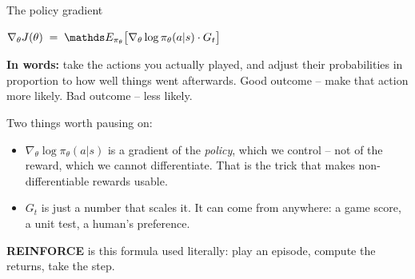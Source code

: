 \documentclass[aspectratio=169]{beamer}
\begin{document}
\begin{frame}{The policy gradient}
  \begin{center}
    {\large $\nabla_\theta J(\theta) \;=\; \E_{\pi_\theta}\big[\nabla_\theta \log \pi_\theta(a|s) \cdot G_t\big]$}
  \end{center}

  \vskip 10pt
  \begin{tcolorbox}[colback=paramgreen!8, colframe=paramgreen, boxrule=0.6pt, arc=2pt]
    \textbf{In words:} take the actions you actually played, and adjust their probabilities in
    proportion to how well things went afterwards. Good outcome -- make that action more
    likely. Bad outcome -- less likely.
  \end{tcolorbox}

  \vskip 10pt
  \small
  Two things worth pausing on:

  \begin{itemize}\itemsep4pt
    \item $\nabla_\theta \log \pi_\theta(a|s)$ is a gradient of the \emph{policy}, which we
          control -- not of the reward, which we cannot differentiate. That is the trick that
          makes non-differentiable rewards usable.
    \item $G_t$ is just a number that scales it. It can come from anywhere: a game score, a
          unit test, a human's preference.
  \end{itemize}

  \vskip 6pt
  \textbf{REINFORCE} is this formula used literally: play an episode, compute the returns,
  take the step.
\end{frame}
\end{document}
